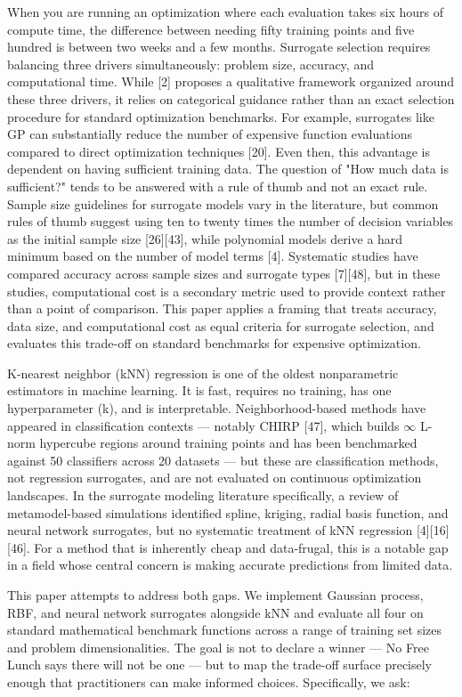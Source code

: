 \documentclass[sigconf,nonacm]{acmart}
\begin{document}
When you are running an optimization where each evaluation takes six hours of compute time, the difference between needing fifty training points and five hundred is between two weeks and a few months. Surrogate selection requires balancing three drivers simultaneously: problem size, accuracy, and computational time. While [2] proposes a qualitative framework organized around these three drivers, it relies on categorical guidance rather than an exact selection procedure for standard optimization benchmarks. For example, surrogates like GP can substantially reduce the number of expensive function evaluations compared to direct optimization techniques [20]. Even then, this advantage is dependent on having sufficient training data. The question of "How much data is sufficient?" tends to be answered with a rule of thumb and not an exact rule. Sample size guidelines for surrogate models vary in the literature, but common rules of thumb suggest using ten to twenty times the number of decision variables as the initial sample size [26][43], while polynomial models derive a hard minimum based on the number of model terms [4]. Systematic studies have compared accuracy across sample sizes and surrogate types [7][48], but in these studies, computational cost is a secondary metric used to provide context rather than a point of comparison. This paper applies a framing that treats accuracy, data size, and computational cost as equal criteria for surrogate selection, and evaluates this trade-off on standard benchmarks for expensive optimization.

K-nearest neighbor (kNN) regression is one of the oldest nonparametric estimators in machine learning. It is fast, requires no training, has one hyperparameter (k), and is interpretable. Neighborhood-based methods have appeared in classification contexts — notably CHIRP [47], which builds $\infty$ L-norm hypercube regions around training points and has been benchmarked against 50 classifiers across 20 datasets — but these are classification methods, not regression surrogates, and are not evaluated on continuous optimization landscapes. In the surrogate modeling literature specifically, a review of metamodel-based simulations identified spline, kriging, radial basis function, and neural network surrogates, but no systematic treatment of kNN regression [4][16][46]. For a method that is inherently cheap and data-frugal, this is a notable gap in a field whose central concern is making accurate predictions from limited data.


This paper attempts to address both gaps. We implement Gaussian process, RBF, and neural network surrogates alongside kNN and evaluate all four on standard mathematical benchmark functions across a range of training set sizes and problem dimensionalities. The goal is not to declare a winner — No Free Lunch says there will not be one — but to map the trade-off surface precisely enough that practitioners can make informed choices. Specifically, we ask:
\end{document}

